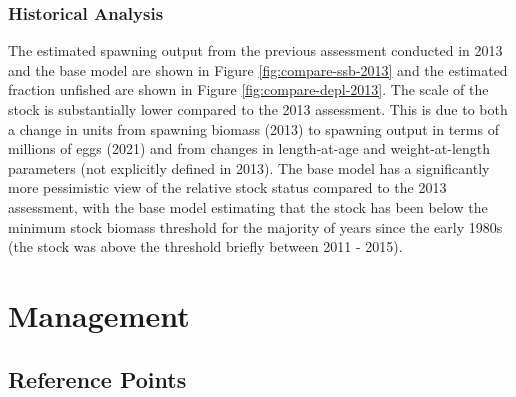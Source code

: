 \documentclass[11pt,
  english,
  a4paper,
]{article}
\begin{document}
\leavevmode\tagmcend\tagstructend\par


\hypertarget{historical-analysis}{%
\subsubsection{Historical Analysis}\label{historical-analysis}}

\leavevmode\tagmcend\tagstructend


The estimated spawning output from the previous assessment conducted in 2013 and the base model are shown in Figure \ref{fig:compare-ssb-2013} and the estimated fraction unfished are shown in Figure \ref{fig:compare-depl-2013}. The scale of the stock is substantially lower compared to the 2013 assessment. This is due to both a change in units from spawning biomass (2013) to spawning output in terms of millions of eggs (2021) and from changes in length-at-age and weight-at-length parameters (not explicitly defined in 2013). The base model has a significantly more pessimistic view of the relative stock status compared to the 2013 assessment, with the base model estimating that the stock has been below the minimum stock biomass threshold for the majority of years since the early 1980s (the stock was above the threshold briefly between 2011 - 2015).

\leavevmode\tagmcend\tagstructend\par


\hypertarget{management}{%
\section{Management}\label{management}}

\leavevmode\tagmcend\tagstructend


\hypertarget{reference-points}{%
\subsection{Reference Points}\label{reference-points}}

\leavevmode\tagmcend\tagstructend

\end{document}
